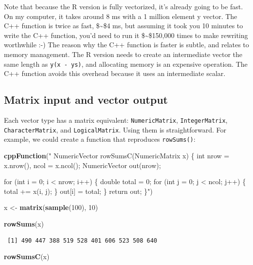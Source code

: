\documentclass[]{krantz}
\makeatletter
\newenvironment{Shaded}{\begin{snugshade}}{\end{snugshade}}
\newcommand{\DecValTok}[1]{\textcolor[rgb]{0.06,0.06,0.06}{#1}}
\newcommand{\KeywordTok}[1]{\textcolor[rgb]{0.27,0.27,0.27}{\textbf{#1}}}
\newcommand{\NormalTok}[1]{#1}
\newcommand{\StringTok}[1]{\textcolor[rgb]{0.5,0.5,0.5}{#1}}
\newenvironment{kframe}{%
\medskip{}
\setlength{\fboxsep}{.8em}
 \def\at@end@of@kframe{}%
 \ifinner\ifhmode%
  \def\at@end@of@kframe{\end{minipage}}%
  \begin{minipage}{\columnwidth}%
 \fi\fi%
 \def\FrameCommand##1{\hskip\@totalleftmargin \hskip-\fboxsep
 \colorbox{shadecolor}{##1}\hskip-\fboxsep
     \hskip-\linewidth \hskip-\@totalleftmargin \hskip\columnwidth}%
 \MakeFramed {\advance\hsize-\width
   \@totalleftmargin\z@ \linewidth\hsize
   \@setminipage}}%
 {\par\unskip\endMakeFramed%
 \at@end@of@kframe}
\renewenvironment{Shaded}{\begin{kframe}}{\end{kframe}}
\makeatother
\begin{document}
Note that because the R version is fully vectorized, it's already going to be fast. On my computer, it takes around 8 ms with a 1 million element y vector. The C++ function is twice as fast, \$\sim\$4 ms, but assuming it took you 10 minutes to write the C++ function, you'd need to run it \$\sim\$150,000 times to make rewriting worthwhile :-) The reason why the C++ function is faster is subtle, and relates to memory management. The R version needs to create an intermediate vector the same length as \texttt{y(x\ -\ ys)}, and allocating memory is an expensive operation. The C++ function avoids this overhead because it uses an intermediate scalar.

\hypertarget{matrix-input-and-vector-output}{%
\subsection{Matrix input and vector output}\label{matrix-input-and-vector-output}}

Each vector type has a matrix equivalent: \texttt{NumericMatrix}, \texttt{IntegerMatrix}, \texttt{CharacterMatrix}, and \texttt{LogicalMatrix}. Using them is straightforward. For example, we could create a function that reproduces \texttt{rowSums()}:

\begin{Shaded}
\begin{Highlighting}[]
\KeywordTok{cppFunction}\NormalTok{(}\StringTok{"}
\StringTok{  NumericVector rowSumsC(NumericMatrix x) \{}
\StringTok{  int nrow = x.nrow(), ncol = x.ncol();}
\StringTok{  NumericVector out(nrow);}

\StringTok{  for (int i = 0; i < nrow; i++) \{}
\StringTok{    double total = 0;}
\StringTok{    for (int j = 0; j < ncol; j++) \{}
\StringTok{    total += x(i, j);}
\StringTok{    \}}
\StringTok{    out[i] = total;}
\StringTok{  \}}
\StringTok{  return out;}
\StringTok{  \}"}\NormalTok{)}

\NormalTok{x <-}\StringTok{ }\KeywordTok{matrix}\NormalTok{(}\KeywordTok{sample}\NormalTok{(}\DecValTok{100}\NormalTok{), }\DecValTok{10}\NormalTok{)}

\KeywordTok{rowSums}\NormalTok{(x)}
\end{Highlighting}
\end{Shaded}

\begin{verbatim}
 [1] 490 447 388 519 528 401 606 523 508 640
\end{verbatim}

\begin{Shaded}
\begin{Highlighting}[]
\KeywordTok{rowSumsC}\NormalTok{(x)}
\end{Highlighting}
\end{Shaded}
\end{document}
